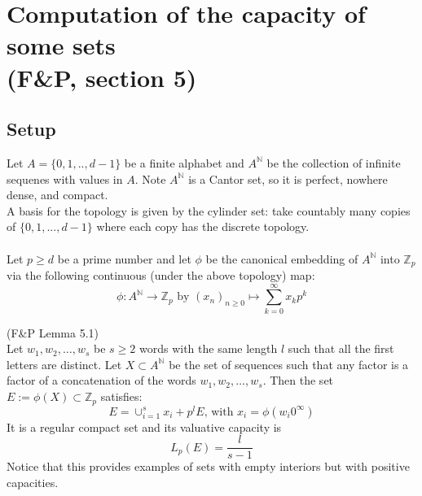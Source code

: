 \section{Computation of the capacity of some sets\\ (F\&P, section 5)}
\subsection*{Setup}
Let $A=\{0,1,..,d-1\}$ be a finite alphabet and $A^{\mathbb{N}}$ be the collection of infinite sequenes with values in $A$. Note $A^{\mathbb{N}}$ is a Cantor set, so it is perfect, nowhere dense, and compact.  \\

A basis for the topology is given by the cylinder set: take countably many copies of $\{0,1,...,d-1\}$ where each copy has the discrete topology.\\\\ Let $p \geq d$ be a prime number and let $\phi$ be the canonical embedding of $A^\mathbb{N}$ into $\mathbb{Z}_p$ via the following continuous (under the above topology) map: \[ \phi: A^{\mathbb{N}} \rightarrow \mathbb{Z}_p \text{ by } (x_n)_{n\geq0} \mapsto \sum_{k=0}^\infty x_kp^k\]

\begin{lemma*} (F\&P Lemma 5.1)\\ Let $w_1,w_2,\ldots,w_s$ be $s\geq 2$ words with the same length $l$ such that all the first letters are distinct. Let $X \subset A^{\mathbb{N}}$ be the set of sequences such that any factor is a factor of a concatenation of the words $w_1,w_2,\ldots,w_s$. Then the set $E := \phi(X) \subset \mathbb{Z}_p$ satisfies: \[E=\cup_{i=1}^s x_i +p^l E \text{,   with } x_i=\phi(w_i0^\infty)\]
It is a regular compact set and its valuative capacity is \[L_p(E) = \frac{l}{s-1}\] Notice that this provides examples of sets with empty interiors but with positive capacities.
\end{lemma*}
\newpage

